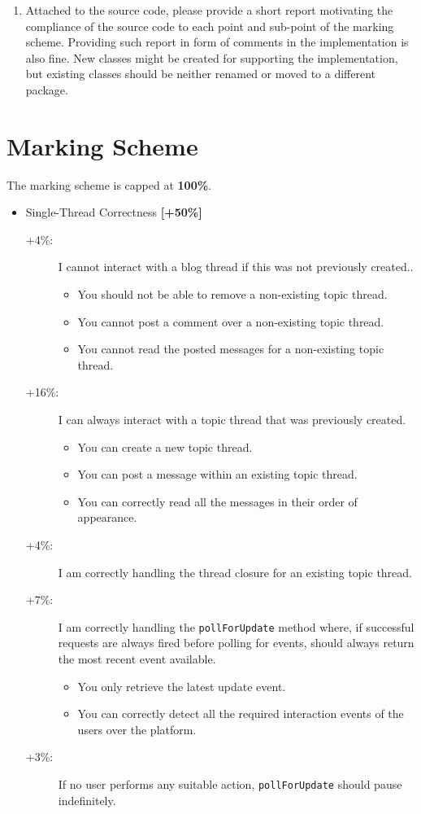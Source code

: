 \documentclass{article}
\begin{document}
\begin{enumerate}
		\item Attached to the source code, please provide a short report motivating the compliance of the source code to each point and sub-point of the marking scheme. Providing such report in form of comments in the implementation is also fine. New classes might be created for supporting the implementation, but  existing classes should be neither renamed or moved to a different package.
		
	\end{enumerate}


	\section*{Marking Scheme} 
\renewcommand{\labelitemii}{$\blacksquare$}
	The marking scheme is capped at  \textbf{100\%}.
	\begin{itemize}
		\item Single-Thread Correctness \textbf{[+50\%]}
			\begin{description}
			\item [+4\%:] I cannot interact with a blog thread if this was not previously created..
\begin{itemize}
\item You should not be able to remove a non-existing topic thread.
\item You cannot post a comment over a non-existing topic thread.
\item You cannot read the posted messages for a non-existing topic thread.
\end{itemize}
			\item [+16\%:] I can always interact with a topic thread that was previously created.
\begin{itemize}
\item You can create a new topic thread.
\item You can post a message within an existing  topic thread.
\item You can correctly read all the messages in their order of appearance.
\end{itemize}

\item [+4\%:] I am correctly handling the thread closure for an existing topic thread.

\item [+7\%:] I am correctly handling the \texttt{pollForUpdate} method where, if successful requests are always fired before polling for events, should always return the most recent event available.
\begin{itemize}
\item You only retrieve the latest update event.
\item You can correctly detect all the required interaction events of the users over the platform.
\end{itemize}
\item [+3\%:] If no user performs any suitable action, \texttt{pollForUpdate} should pause indefinitely.


\end{description}
\end{itemize}
\end{document}
